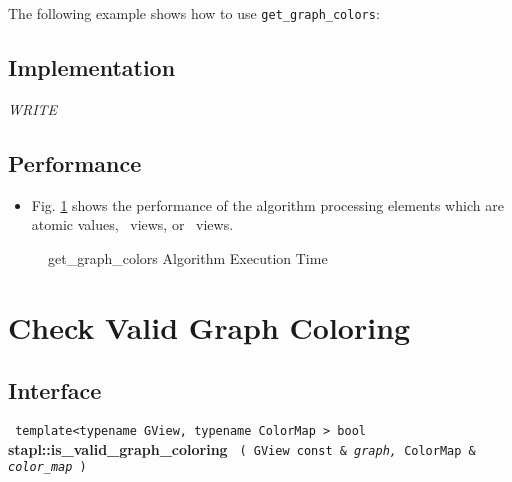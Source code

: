 The following example shows how to use 
\texttt{get\_graph\_colors}:


\subsection{Implementation} \label{sec-get-graf-color-alg-impl}

\textit{WRITE}

\subsection{Performance} \label{sec-get-graf-color-alg-perf}

\begin{itemize}
\item
Fig. \ref{fig:get-graf-color-alg-exec-exper}
shows the performance of the algorithm processing
elements which are atomic values, \stl\ views, or \stapl\ views.
\end{itemize}

\begin{figure}[p]
\caption{ get\_graph\_colors Algorithm Execution Time}
\label{fig:get-graf-color-alg-exec-exper}
\end{figure}


\section{ Check Valid Graph Coloring}
\label{sec-is-valid-color-alg} 

\subsection{Interface} \label{sec-is-valid-color-alg-inter}

\noindent
\texttt{%
template<typename GView, typename ColorMap >
\newline
bool 
}
\newline
\textbf{stapl::is\_valid\_graph\_coloring}%
\newline
\texttt{%
(
GView const \&
\textit{graph,}%
ColorMap \&
\textit{color\_map}%
)     
}
\vspace{0.4cm}

